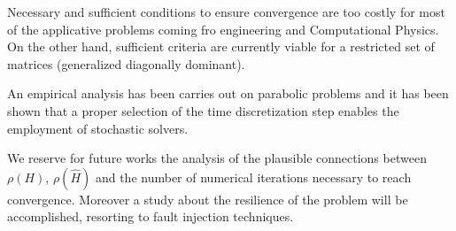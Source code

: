 \documentclass[a4paper,10pt]{article}
\begin{document}
Necessary and sufficient conditions to ensure convergence are too costly for 
most of the applicative problems coming fro engineering and Computational 
Physics. On the other hand, sufficient criteria are currently viable for a
restricted set of matrices (generalized diagonally dominant). 

An empirical analysis has been carries out on parabolic problems and it has 
been shown that a proper selection of the time discretization step enables the 
employment of stochastic solvers.

We reserve for future works the analysis of the plausible connections between 
$\rho(H)$, $\rho(\hat{H})$ and the number of numerical iterations necessary to 
reach convergence. Moreover a study about the resilience of the problem will be 
accomplished, resorting to fault injection techniques.




\end{document}
